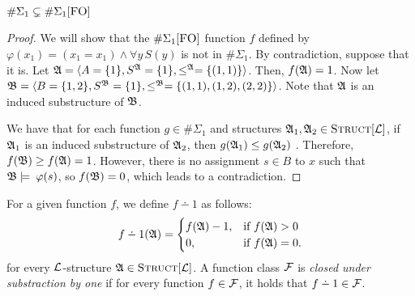 \begin{theo}
	$\#\Sigma_1 \subsetneq \E1$
\end{theo}
\begin{proof}
	We will show that the $\E1$ function $f$ defined by $\varphi(x_1) = (x_1 = x_1) \wedge \forall y \, S(y)$ is not in $\#\Sigma_1$. By contradiction, suppose that it is. Let ${\frak A} = \langle A =\{1\},S^{\frak A} = \{1\},\leq^{\frak A}=\{(1,1)\} \rangle$. Then, $f({\frak A}) = 1$. Now let ${\frak B} = \langle B =\{1,2\},S^{\frak B} = \{1\},\leq^{\frak B}=\{(1,1),(1,2),(2,2)\} \rangle$. Note that ${\frak A}$ is an induced substructure of ${\frak B}$.
	
	We have that for each function $g \in \#\Sigma_1$ and structures ${\frak A}_1,{\frak A}_2\in\textsc{Struct}[{\cal L}]$, if ${\frak A}_1$ is an induced substructure of ${\frak A}_2$, then $g({\frak A}_1) \leq g({\frak A}_2)$ \cite{DBLP:journals/jcss/SalujaST95}. Therefore, $f({\frak B}) \geq f({\frak A}) = 1$. However, there is no assignment $s\in B$ to $x$ such that ${\frak B}\models\:\varphi(s)$, so $f({\frak B}) = 0$, which leads to a contradiction.
\end{proof}

For a given function $f$, we define $f \dotminus 1$ as follows:
\begin{eqnarray*}
	f \dotminus 1(\A) =
	\begin{cases}
		f(\A)-1, & \text{if }f(\A) > 0 \\
		0, & \text{if }f(\A) = 0.
	\end{cases}
\end{eqnarray*}
for every ${\cal L}$-structure ${\frak A} \in \textsc{Struct}[{\cal L}]$. A function class ${\cal F}$ is {\em closed under substraction by one} if for every function $f \in {\cal F}$, it holds that $f \dotminus 1 \in \F$.



